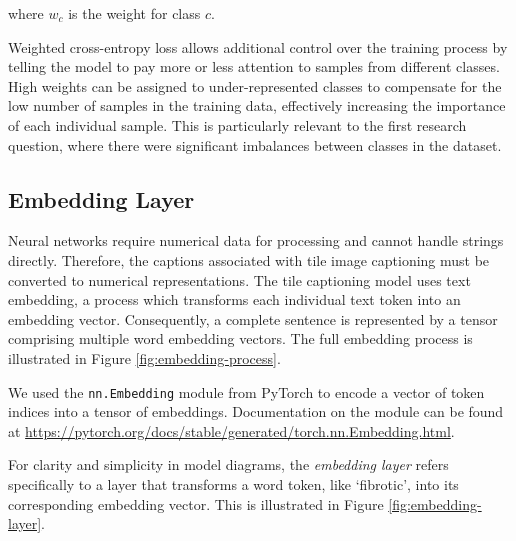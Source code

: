 \documentclass{l4proj}
\begin{document}
where $w_c$ is the weight for class $c$.

Weighted cross-entropy loss allows additional control over the training process by telling the model to pay more or less attention to samples from different classes. High weights can be assigned to under-represented classes to compensate for the low number of samples in the training data, effectively increasing the importance of each individual sample. This is particularly relevant to the first research question, where there were significant imbalances between classes in the dataset.


\subsection{Embedding Layer} \label{sec:embedding-layer}
Neural networks require numerical data for processing and cannot handle strings directly. Therefore, the captions associated with tile image captioning must be converted to numerical representations. The tile captioning model uses text embedding, a process which transforms each individual text token into an embedding vector. Consequently, a complete sentence is represented by a tensor comprising multiple word embedding vectors. The full embedding process is illustrated in Figure \ref{fig:embedding-process}. 

We used the \verb|nn.Embedding| module from PyTorch to encode a vector of token indices into a tensor of embeddings. Documentation on the module can be found at \url{https://pytorch.org/docs/stable/generated/torch.nn.Embedding.html}.

For clarity and simplicity in model diagrams, the \emph{embedding layer} refers specifically to a layer that transforms a word token, like `fibrotic', into its corresponding embedding vector. This is illustrated in Figure \ref{fig:embedding-layer}.
\end{document}
